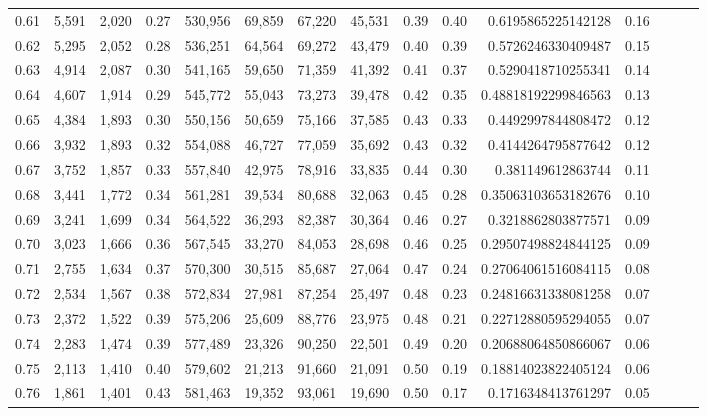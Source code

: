\begin{tabular}{rrrrrrrrrrrrrrr}
0.61 &   5,591 &  2,020 &  0.27 &  530,956 &   69,859 &   67,220 &   45,531 &  0.39 &  0.40 &    0.6195865225142128 &      0.16 \\
0.62 &   5,295 &  2,052 &  0.28 &  536,251 &   64,564 &   69,272 &   43,479 &  0.40 &  0.39 &    0.5726246330409487 &      0.15 \\
0.63 &   4,914 &  2,087 &  0.30 &  541,165 &   59,650 &   71,359 &   41,392 &  0.41 &  0.37 &    0.5290418710255341 &      0.14 \\
0.64 &   4,607 &  1,914 &  0.29 &  545,772 &   55,043 &   73,273 &   39,478 &  0.42 &  0.35 &   0.48818192299846563 &      0.13 \\
0.65 &   4,384 &  1,893 &  0.30 &  550,156 &   50,659 &   75,166 &   37,585 &  0.43 &  0.33 &    0.4492997844808472 &      0.12 \\
0.66 &   3,932 &  1,893 &  0.32 &  554,088 &   46,727 &   77,059 &   35,692 &  0.43 &  0.32 &    0.4144264795877642 &      0.12 \\
0.67 &   3,752 &  1,857 &  0.33 &  557,840 &   42,975 &   78,916 &   33,835 &  0.44 &  0.30 &     0.381149612863744 &      0.11 \\
0.68 &   3,441 &  1,772 &  0.34 &  561,281 &   39,534 &   80,688 &   32,063 &  0.45 &  0.28 &   0.35063103653182676 &      0.10 \\
0.69 &   3,241 &  1,699 &  0.34 &  564,522 &   36,293 &   82,387 &   30,364 &  0.46 &  0.27 &    0.3218862803877571 &      0.09 \\
0.70 &   3,023 &  1,666 &  0.36 &  567,545 &   33,270 &   84,053 &   28,698 &  0.46 &  0.25 &   0.29507498824844125 &      0.09 \\
0.71 &   2,755 &  1,634 &  0.37 &  570,300 &   30,515 &   85,687 &   27,064 &  0.47 &  0.24 &   0.27064061516084115 &      0.08 \\
0.72 &   2,534 &  1,567 &  0.38 &  572,834 &   27,981 &   87,254 &   25,497 &  0.48 &  0.23 &   0.24816631338081258 &      0.07 \\
0.73 &   2,372 &  1,522 &  0.39 &  575,206 &   25,609 &   88,776 &   23,975 &  0.48 &  0.21 &   0.22712880595294055 &      0.07 \\
0.74 &   2,283 &  1,474 &  0.39 &  577,489 &   23,326 &   90,250 &   22,501 &  0.49 &  0.20 &   0.20688064850866067 &      0.06 \\
0.75 &   2,113 &  1,410 &  0.40 &  579,602 &   21,213 &   91,660 &   21,091 &  0.50 &  0.19 &   0.18814023822405124 &      0.06 \\
0.76 &   1,861 &  1,401 &  0.43 &  581,463 &   19,352 &   93,061 &   19,690 &  0.50 &  0.17 &    0.1716348413761297 &      0.05 \\

\end{tabular}
